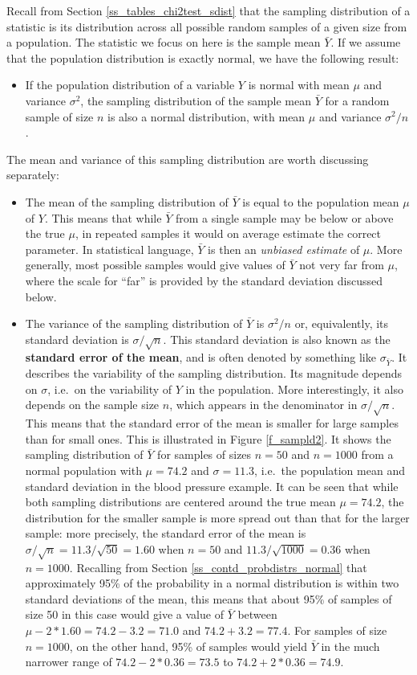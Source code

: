 Recall from Section \ref{ss_tables_chi2test_sdist} that the sampling
distribution of a statistic is its distribution across all possible
random samples of a given size from a population. The statistic we focus
on here is the sample mean $\bar{Y}$. If we assume that the population
distribution is exactly normal, we have the following result:
\begin{itemize}
\item
If the population distribution of a variable $Y$ is normal with mean
$\mu$ and variance $\sigma^{2}$, the sampling distribution of the sample
mean $\bar{Y}$ for a random sample of size $n$ is also a normal
distribution, with mean $\mu$ and variance $\sigma^{2}/n$.
\end{itemize}
The mean and variance of this sampling distribution
are worth discussing separately:
\begin{itemize}
\item
The mean of the sampling distribution of $\bar{Y}$ is equal to the
population mean $\mu$ of $Y$.
This means that while $\bar{Y}$ from a single sample may be below or above the true
$\mu$, in repeated samples it would on average estimate the correct
parameter.
In statistical language, $\bar{Y}$
is then an \emph{unbiased estimate} of $\mu$.
More generally,
most possible samples would give values of $\bar{Y}$ not very far from
$\mu$, where the scale for ``far'' is provided by the standard deviation
discussed below.
\item
The variance of the sampling distribution of $\bar{Y}$ is $\sigma^{2}/n$
or, equivalently, its standard deviation is $\sigma/\sqrt{n}$. This
standard deviation is also known as the \textbf{standard error of the
mean}, and is often denoted by something like
$\sigma_{\bar{Y}}$. It describes the variability of the sampling
distribution. Its magnitude depends on $\sigma$, i.e.\ on the
variability of $Y$ in the population. More interestingly, it also
depends on the sample size $n$, which appears in the denominator in
$\sigma/\sqrt{n}$. This means that the standard error of the mean is
smaller for large samples than for small ones. This is illustrated in
Figure \ref{f_sampld2}. It shows the sampling distribution of $\bar{Y}$
for samples of sizes $n=50$ and $n=1000$ from a normal population with
$\mu=74.2$ and $\sigma=11.3$, i.e.\ the population mean and standard
deviation in the blood pressure example.
It can be seen that while both sampling
distributions are centered around the true mean $\mu=74.2$, the
distribution for the smaller sample is more spread out than that for the
larger sample: more precisely, the standard error of the mean is
$\sigma/\sqrt{n}=11.3/\sqrt{50}=1.60$ when $n=50$ and
$11.3/\sqrt{1000}=0.36$
when $n=1000$. Recalling from Section
\ref{ss_contd_probdistrs_normal} that
approximately 95\% of the probability in a normal distribution is
within two standard deviations of the mean, this means that about 95\%
of samples of size 50 in this case would give a value of $\bar{Y}$
between $\mu-2*1.60=74.2-3.2=71.0$ and $74.2+3.2=77.4$. For samples of size
$n=1000$, on the other hand, 95\% of samples would yield
$\bar{Y}$ in the much narrower range of $74.2-2*0.36=73.5$ to
$74.2+2*0.36=74.9$.
\end{itemize}

